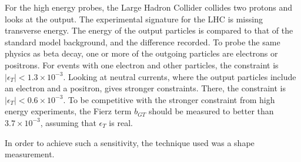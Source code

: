 \documentclass[../MaxHughesThesis.tex]{subfiles}
\begin{document}
For the high energy probes, the Large Hadron Collider collides two protons and looks at the output. 
The experimental signature for the LHC is missing transverse energy.
The energy of the output particles is compared to that of the standard model background, and the difference recorded.
To probe the same physics as beta decay, one or more of the outgoing particles are electrons or positrons.
For events with one electron and other particles, the constraint is $|\epsilon_{T}| < 1.3 \times 10^{-3}$.
Looking at neutral currents, where the output particles include an electron and a positron, gives stronger constraints.
There, the constraint is $|\epsilon_{T}| < 0.6 \times 10^{-3}$.
To be competitive with the stronger constraint from high energy experiments, the Fierz term $b_{GT}$ should be measured to better than $3.7 \times 10^{-3}$, assuming that $\epsilon_{T}$ is real. 

In order to achieve such a sensitivity, the technique used was a shape measurement.
\end{document}

